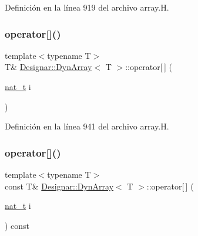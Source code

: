 Definición en la línea 919 del archivo array.\+H.

\mbox{\label{class_designar_1_1_dyn_array_ac24a3b500af13093ade4978739e2d6e3}} 
\subsubsection{\texorpdfstring{operator[]()}{operator[]()}\hspace{0.1cm}{\footnotesize\ttfamily [1/2]}}
{\footnotesize\ttfamily template$<$typename T$>$ \\
T\& \hyperlink{class_designar_1_1_dyn_array}{Designar\+::\+Dyn\+Array}$<$ T $>$\+::operator\mbox{[}$\,$\mbox{]} (\begin{DoxyParamCaption}\item[{\hyperlink{namespace_designar_aa72662848b9f4815e7bf31a7cf3e33d1}{nat\+\_\+t}}]{i }\end{DoxyParamCaption})\hspace{0.3cm}{\ttfamily [inline]}}



Definición en la línea 941 del archivo array.\+H.

\mbox{\label{class_designar_1_1_dyn_array_af329e06efe69cb53e9d1a44a1ed0beeb}} 
\subsubsection{\texorpdfstring{operator[]()}{operator[]()}\hspace{0.1cm}{\footnotesize\ttfamily [2/2]}}
{\footnotesize\ttfamily template$<$typename T$>$ \\
const T\& \hyperlink{class_designar_1_1_dyn_array}{Designar\+::\+Dyn\+Array}$<$ T $>$\+::operator\mbox{[}$\,$\mbox{]} (\begin{DoxyParamCaption}\item[{\hyperlink{namespace_designar_aa72662848b9f4815e7bf31a7cf3e33d1}{nat\+\_\+t}}]{i }\end{DoxyParamCaption}) const\hspace{0.3cm}{\ttfamily [inline]}}



